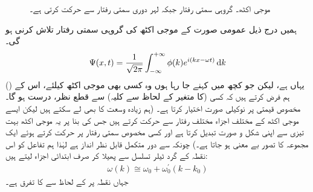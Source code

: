 \begin{figure}
\centering
{}
\caption{موجی اکٹھ۔ گروہی سمتی رفتار جبکہ لہر دوری سمتی رفتار سے حرکت کرتی ہے۔}
\label{شکل_غیر_تابع_موجی_اکٹھ_رفتاریں}
\end{figure}
 ہمیں درج ذیل عمومی صورت کے موجی اکٹھ کی گروہی سمتی رفتار تلاش کرنی ہو گی۔ 
\begin{align*}
\Psi (x,t) = \frac{1}{\sqrt{2\pi}} \int_{- \infty}^{+ \infty} \phi (k) e^{i(kx - \omega t)} \dif k
\end{align*}
 (یہاں  ہے، لیکن جو کچھ میں کہنے جا رہا ہوں وہ کسی بھی موجی اکٹھ کیلئے، اس کے  ( کا متغیر  کے لحاظ سے کلیہ) سے قطع نظر، درست ہو گا۔) ہم فرض کرتے ہیں کہ کسی مخصوص قیمتی  پر  نوکیلی صورت اختیار کرتا ہے۔ (ہم زیادہ وسعت کا  بھی لے سکتے ہیں لیکن ایسے موجی اکٹھ کے مختلف اجزاء مختلف رفتار سے حرکت کرتے ہیں جس کی بنا پر یہ موجی اکٹھ بہت تیزی سے اپنی شکل و صورت تبدیل کرتا ہے اور کسی مخصوص سمتی رفتار پر حرکت کرتے ہوئے ایک مجموعہ کا تصور بے معنی ہو جاتا ہے۔) چونکہ  سے دور متکمل قابل نظر انداز ہے لہٰذا ہم تفاعل  کو اس نقطہ کے گرد ٹیلر تسلسل سے پھیلا کر صرف ابتدائی اجزاء لیتے ہیں:
\begin{align*}
\omega (k) \cong \omega_{0} + \omega_{0}^{'} (k-k_{0})
\end{align*}
 جہاں نقطہ  پر  کے لحاظ سے  کا تفرق  ہے۔
 
